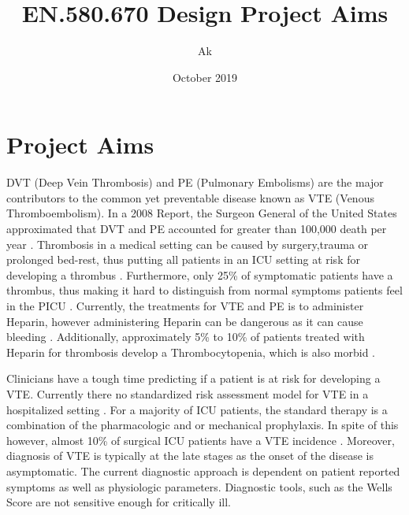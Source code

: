 \documentclass{article}
\title{EN.580.670 Design Project Aims}
\author{Ak}
\date{October 2019}
\begin{document}
\maketitle



\section{Project Aims}
DVT (Deep Vein Thrombosis) and PE (Pulmonary Embolisms) are the major contributors to the common yet preventable disease known as VTE (Venous Thromboembolism). In a 2008 Report, the Surgeon General of the United States approximated that DVT and PE accounted for greater than 100,000 death per year \cite{SG}.  Thrombosis in a medical setting can be caused by surgery,trauma or prolonged bed-rest, thus putting all patients in an ICU setting at risk for developing a thrombus \cite{kyrle2005deep}. Furthermore, only 25\% of symptomatic patients have a thrombus, thus making it hard to distinguish from normal symptoms patients feel in the PICU \cite{kyrle2005deep}. Currently, the treatments for VTE and PE is to administer Heparin, however administering Heparin can be dangerous as it can cause bleeding \cite{walker1980predictors}. Additionally, approximately 5\% to 10\% of patients treated with Heparin for thrombosis develop a Thrombocytopenia, which is also morbid \cite{sheridan1986diagnostic}.

Clinicians have a tough time predicting if a patient is at risk for developing a VTE. Currently there no standardized risk assessment model for VTE in a hospitalized setting \cite{stuck2017risk}. For a majority of ICU patients, the standard therapy is a combination of the pharmacologic and or mechanical prophylaxis. In spite of this however, almost 10\% of surgical ICU patients have a VTE incidence \cite{cook2001prevention}. Moreover, diagnosis of VTE is typically at the late stages as the onset of the disease is asymptomatic. The current diagnostic approach is dependent on patient reported symptoms as well as physiologic parameters. Diagnostic tools, such as the Wells Score are not sensitive enough for critically ill. 

\newpage


\end{document}
